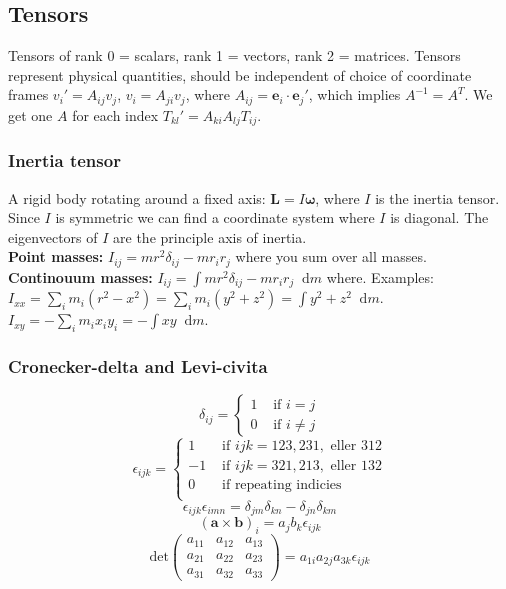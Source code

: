 \documentclass[a4paper, 10pt]{article}
\newcommand*\diff{\mathop{}\!\mathrm{d}}
\begin{document}
\begin{multicols*}{3}
\begin{mdframed}
\subsection*{Tensors}
\end{mdframed}
Tensors of rank 0 = scalars, rank 1 = vectors, rank 2 = matrices. Tensors represent physical quantities, should be independent of choice of coordinate frames
$v_i' = A_{ij}v_j$, $v_i = A_{ji}v_j$, where $A_{ij} = \bm{e}_i\cdot \bm{e}_j'$, which implies $A^{-1} = A^{T}$. We get one $A$ for each index  $T_{kl}' = A_{ki}A_{lj}T_{ij}$.
\subsubsection*{Inertia tensor}
A rigid body rotating around a fixed axis: $\bm{L}=I\bm{\omega}$, where $I$ is the inertia tensor. Since $I$ is symmetric we can find a coordinate system where $I$ is diagonal. The eigenvectors of $I$ are the principle axis of inertia. \\
\textbf{Point masses:} $I_{ij} = mr^2\delta_{ij}-mr_ir_j$ where you sum over all masses.\\
\textbf{Continouum masses:} $I_{ij} = \int mr^2\delta_{ij}-mr_ir_j \diff m$ where. Examples:\\
$I_{xx} = \sum_i m_i(r^2 -x^2) = \sum_i m_i(y^2 + z^2) = \int y^2 + z^2 \diff m$.\\
$I_{xy} = -\sum_{i}m_ix_iy_i = - \int xy \diff m$.
\subsubsection*{Cronecker-delta and Levi-civita}

\[
\delta_{ij}=\begin{cases}
1 & \mbox{ if } i=j \\
0 & \mbox{ if } i\neq j
\end{cases}\]
\[
\epsilon_{ijk}=\begin{cases}
1 & \mbox{ if } ijk=123,231, \mbox{ eller } 312 \\
-1 & \mbox{ if } ijk=321,213, \mbox{ eller } 132 \\
0 & \mbox{ if repeating indicies} \\
\end{cases}
\]
\[
\epsilon_{ijk}\epsilon_{imn}=\delta_{jm}\delta_{kn}-\delta_{jn}\delta_{km}
\]
$$(\mathbf{a}\times \mathbf{b})_i = a_j b_k \epsilon_{ijk}$$
\[
\mbox{det}\left(\begin{matrix}
a_{11} & a_{12} & a_{13} \\
a_{21} & a_{22} & a_{23} \\
a_{31} & a_{32} & a_{33}
\end{matrix}\right)=a_{1i}a_{2j}a_{3k}\epsilon_{ijk}
\]


\end{multicols*}
\end{document}

